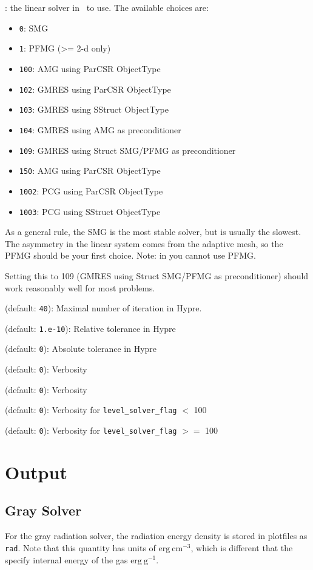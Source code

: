 \begin{description}
\item {}: the linear solver
  in \hypre\ to use.  The available choices are:
  \begin{itemize}
    \item {\tt 0}: SMG
    \item {\tt 1}: PFMG  (>= 2-d only)
    \item {\tt 100}: AMG using ParCSR ObjectType
    \item {\tt 102}: GMRES using ParCSR ObjectType
    \item {\tt 103}: GMRES using SStruct ObjectType
    \item {\tt 104}: GMRES using AMG as preconditioner
    \item {\tt 109}: GMRES using Struct SMG/PFMG as preconditioner
    \item {\tt 150}: AMG using ParCSR ObjectType
    \item {\tt 1002}: PCG using ParCSR ObjectType
    \item {\tt 1003}: PCG using SStruct ObjectType
  \end{itemize}

  As a general rule, the SMG is the most stable solver, but is usually
  the slowest.  The asymmetry in the linear system comes from the
  adaptive mesh, so the PFMG should be your first choice.  Note: in
  you cannot use PFMG.

  Setting this to 109 (GMRES using Struct SMG/PFMG as preconditioner)
  should work reasonably well for most problems.

\item {} (default: {\tt 40}): 
  Maximal number of iteration in Hypre.

\item {} (default: {\tt 1.e-10}):
  Relative tolerance in Hypre

\item {} (default: {\tt 0}):
  Absolute tolerance in Hypre

\item {} (default: {\tt 0}):
  Verbosity

\item {} (default: {\tt 0}):
  Verbosity

\item {} (default: {\tt 0}):
  Verbosity for {\tt level\_solver\_flag} $<$ 100

\item {} (default: {\tt 0}):
  Verbosity for {\tt level\_solver\_flag} $>=$ 100
\end{description}


\section{Output}

\subsection{Gray Solver}

For the gray radiation solver, the radiation energy density is stored in plotfiles
as {\tt rad}.  Note that this quantity has units of $\mathrm{erg~cm^{-3}}$, which
is different that the specify internal energy of the gas $\mathrm{erg~g^{-1}}$.


